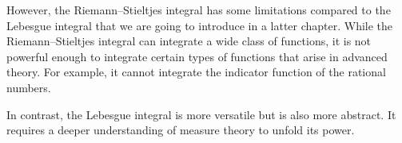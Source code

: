 However, the Riemann--Stieltjes integral has some limitations compared to the Lebesgue integral that we are going to introduce in a latter chapter. While the Riemann--Stieltjes integral can integrate a wide class of functions, it is not powerful enough to integrate certain types of functions that arise in advanced theory. For example, it cannot integrate the indicator function of the rational numbers.

In contrast, the Lebesgue integral is more versatile but is also more abstract. It requires a deeper understanding of measure theory to unfold its power.
